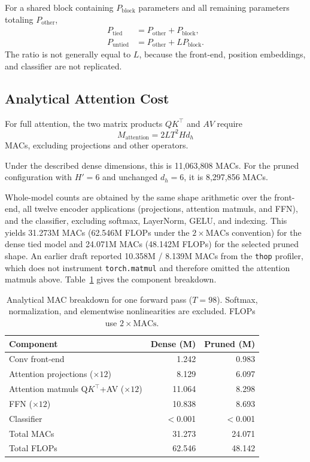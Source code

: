 \documentclass[journal]{IEEEtran}
\begin{document}
For a shared block containing $P_{\mathrm{block}}$ parameters
and all remaining parameters totaling $P_{\mathrm{other}}$,
\begin{align}
P_{\mathrm{tied}}&=P_{\mathrm{other}}+P_{\mathrm{block}},\\
P_{\mathrm{untied}}&=P_{\mathrm{other}}+LP_{\mathrm{block}}.
\end{align}
The ratio is not generally equal to $L$, because the front-end,
position embeddings, and classifier are not replicated.

\subsection{Analytical Attention Cost}

For full attention, the two matrix products $QK^\top$ and $AV$
require
\begin{equation}
M_{\mathrm{attention}}
=
2LT^2Hd_h
\label{eq:attention-macs}
\end{equation}
MACs, excluding projections and other operators.

Under the described dense dimensions, this is
11,063,808 MACs.
For the pruned configuration with $H'=6$ and unchanged
$d_h=6$, it is 8,297,856 MACs.

Whole-model counts are obtained by the same shape arithmetic
over the front-end, all twelve encoder applications
(projections, attention matmuls, and FFN), and the classifier,
excluding softmax, LayerNorm, GELU, and indexing.
This yields 31.273M MACs (62.546M FLOPs under the
$2\times\mathrm{MACs}$ convention) for the dense tied model and
24.071M MACs (48.142M FLOPs) for the selected pruned shape.
An earlier draft reported 10.358M / 8.139M MACs from the
\texttt{thop} profiler, which does not instrument
\texttt{torch.matmul} and therefore omitted the attention
matmuls above.
Table~\ref{tab:macs} gives the component breakdown.

\begin{table}[t]
\caption{Analytical MAC breakdown for one forward pass
($T{=}98$). Softmax, normalization, and elementwise nonlinearities
are excluded. FLOPs use $2\times\mathrm{MACs}$.}
\label{tab:macs}
\centering
\footnotesize
\begin{tabular}{lrr}
\toprule
Component & Dense (M) & Pruned (M)\\
\midrule
Conv front-end & 1.242 & 0.983\\
Attention projections ($\times12$) & 8.129 & 6.097\\
Attention matmuls Q$K^\top$+AV ($\times12$) & 11.064 & 8.298\\
FFN ($\times12$) & 10.838 & 8.693\\
Classifier & $<$0.001 & $<$0.001\\
\midrule
Total MACs & 31.273 & 24.071\\
Total FLOPs & 62.546 & 48.142\\
\bottomrule
\end{tabular}
\end{table}
\end{document}
